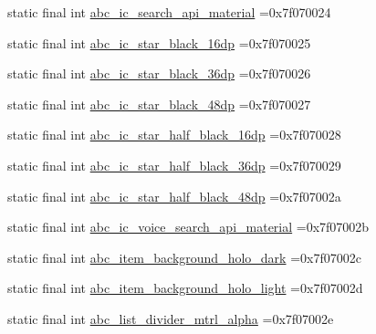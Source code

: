 \begin{DoxyCompactItemize}
\item 
static final int \mbox{\hyperlink{classbr_1_1unb_1_1cic_1_1mp_1_1marketmaster_1_1test_1_1R_1_1drawable_a31f0c9b9b25cbe349c54c156400be15d}{abc\+\_\+ic\+\_\+search\+\_\+api\+\_\+material}} =0x7f070024
\item 
static final int \mbox{\hyperlink{classbr_1_1unb_1_1cic_1_1mp_1_1marketmaster_1_1test_1_1R_1_1drawable_ad6a815980bbf04f08bf4940aa36389cf}{abc\+\_\+ic\+\_\+star\+\_\+black\+\_\+16dp}} =0x7f070025
\item 
static final int \mbox{\hyperlink{classbr_1_1unb_1_1cic_1_1mp_1_1marketmaster_1_1test_1_1R_1_1drawable_ac6fddaf9b841712855bddea89e55e0c1}{abc\+\_\+ic\+\_\+star\+\_\+black\+\_\+36dp}} =0x7f070026
\item 
static final int \mbox{\hyperlink{classbr_1_1unb_1_1cic_1_1mp_1_1marketmaster_1_1test_1_1R_1_1drawable_adc58c3748bb08245c5da0286a07d1a76}{abc\+\_\+ic\+\_\+star\+\_\+black\+\_\+48dp}} =0x7f070027
\item 
static final int \mbox{\hyperlink{classbr_1_1unb_1_1cic_1_1mp_1_1marketmaster_1_1test_1_1R_1_1drawable_a035d8327556b7265b29c39cc5d4dcf54}{abc\+\_\+ic\+\_\+star\+\_\+half\+\_\+black\+\_\+16dp}} =0x7f070028
\item 
static final int \mbox{\hyperlink{classbr_1_1unb_1_1cic_1_1mp_1_1marketmaster_1_1test_1_1R_1_1drawable_aee2519bf742b5fa11687f91727882ea2}{abc\+\_\+ic\+\_\+star\+\_\+half\+\_\+black\+\_\+36dp}} =0x7f070029
\item 
static final int \mbox{\hyperlink{classbr_1_1unb_1_1cic_1_1mp_1_1marketmaster_1_1test_1_1R_1_1drawable_a02bd23b61400fcf6755dbb76a39de9fa}{abc\+\_\+ic\+\_\+star\+\_\+half\+\_\+black\+\_\+48dp}} =0x7f07002a
\item 
static final int \mbox{\hyperlink{classbr_1_1unb_1_1cic_1_1mp_1_1marketmaster_1_1test_1_1R_1_1drawable_a50451ba19e640f863c223f6fd4553fd4}{abc\+\_\+ic\+\_\+voice\+\_\+search\+\_\+api\+\_\+material}} =0x7f07002b
\item 
static final int \mbox{\hyperlink{classbr_1_1unb_1_1cic_1_1mp_1_1marketmaster_1_1test_1_1R_1_1drawable_a4409ceddd0bb0de423a468c395a67513}{abc\+\_\+item\+\_\+background\+\_\+holo\+\_\+dark}} =0x7f07002c
\item 
static final int \mbox{\hyperlink{classbr_1_1unb_1_1cic_1_1mp_1_1marketmaster_1_1test_1_1R_1_1drawable_a2542ec77d204ed9635c817e387972e3a}{abc\+\_\+item\+\_\+background\+\_\+holo\+\_\+light}} =0x7f07002d
\item 
static final int \mbox{\hyperlink{classbr_1_1unb_1_1cic_1_1mp_1_1marketmaster_1_1test_1_1R_1_1drawable_ab52097549a9feda5c1ab2a2173625043}{abc\+\_\+list\+\_\+divider\+\_\+mtrl\+\_\+alpha}} =0x7f07002e

\end{DoxyCompactItemize}
